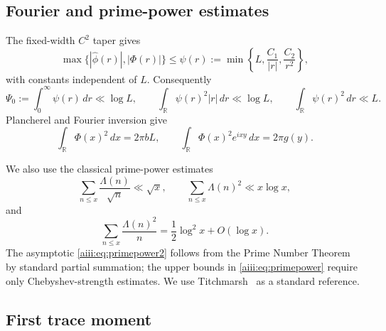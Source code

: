 \documentclass[11pt]{article}
\newcommand{\R}{\mathbb R}
\begin{document}
\subsection{Fourier and prime-power estimates}

The fixed-width $C^2$ taper gives
\begin{equation}\label{aiii:eq:psi}
 \max\{|\widehat\phi(r)|,|\Phi(r)|\}
 \le \psi(r):=
 \min\left\{L,\frac{C_1}{|r|},\frac{C_2}{r^2}\right\},
\end{equation}
with constants independent of $L$.  Consequently
\begin{equation}\label{aiii:eq:psimom}
 \Psi_0:=\int_0^\infty\psi(r)\,dr\ll\log L,
 \qquad
 \int_\R \psi(r)^2|r|\,dr\ll\log L,
 \qquad
 \int_\R\psi(r)^2\,dr\ll L.
\end{equation}
Plancherel and Fourier inversion give
\begin{equation}\label{aiii:eq:Phi}
 \int_\R\Phi(x)^2\,dx=2\pi bL,
 \qquad
 \int_\R\Phi(x)^2e^{ixy}\,dx=2\pi g(y).
\end{equation}

We also use the classical prime-power estimates
\begin{equation}\label{aiii:eq:primepower}
 \sum_{n\le x}\frac{\Lambda(n)}{\sqrt n}\ll\sqrt x,
 \qquad
 \sum_{n\le x}\Lambda(n)^2\ll x\log x,
\end{equation}
and
\begin{equation}\label{aiii:eq:primepower2}
 \sum_{n\le x}\frac{\Lambda(n)^2}{n}
 =\frac12\log^2x+O(\log x).
\end{equation}
The asymptotic \eqref{aiii:eq:primepower2} follows from the Prime Number
Theorem by standard partial summation; the upper bounds in
\eqref{aiii:eq:primepower} require only Chebyshev-strength estimates.
We use Titchmarsh~\cite{Titchmarsh86} as a standard reference.

\subsection{First trace moment}
\end{document}
